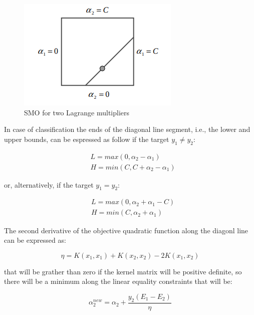 \begin{figure}[h!]
	\centering
	\includegraphics[scale=0.5]{img/smo_multipliers.png}
	\caption{SMO for two Lagrange multipliers}
	\label{fig:smo_lagrange_multipliers}
\end{figure}

In case of classification the ends of the diagonal line segment, i.e., the lower and upper bounds, can be espressed as follow if the target $y_1 \ne y_2$:

\begin{equation} \label{eq:smo_svc_bounds_update1}
	\begin{aligned}
		& L = max(0, \alpha_2 - \alpha_1) \\
		& H = min(C, C + \alpha_2 - \alpha_1)
	\end{aligned}
\end{equation}

or, alternatively, if the target $y_1 = y_2$:

\begin{equation} \label{eq:smo_svc_bounds_update2}
	\begin{aligned}
		& L = max(0, \alpha_2 + \alpha_1 - C) \\
		& H = min(C, \alpha_2 + \alpha_1)
	\end{aligned}
\end{equation}

The second derivative of the objective quadratic function along the diagonl line can be expressed as:

\begin{equation} \label{eq:smo_eta}
	\eta = K(x_1, x_1) + K(x_2, x_2) - 2K(x_1, x_2)
\end{equation}

that will be grather than zero if the kernel matrix will be positive definite, so there will be a minimum along the linear equality constraints that will be:

\begin{equation} \label{eq:smo_svc_a2_new}
	\alpha_2^{new} = \alpha_2 + \frac{y_2(E_1 - E_2)}{\eta}
\end{equation}

